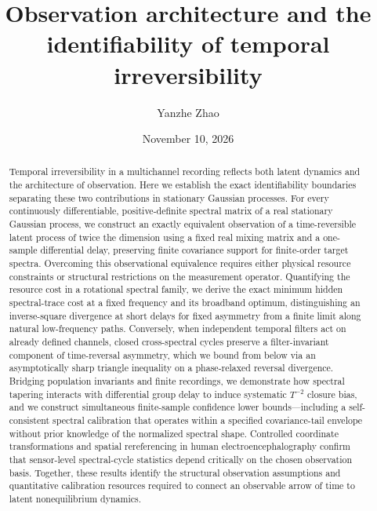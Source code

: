 \documentclass[aps,pre,reprint,amsmath,amssymb,superscriptaddress]{revtex4-2}
\begin{document}
\title{Observation architecture and the identifiability of temporal irreversibility}
\author{Yanzhe Zhao}
\date{November 10, 2026}
\begin{abstract}
Temporal irreversibility in a multichannel recording reflects both latent dynamics and the architecture of observation. Here we establish the exact identifiability boundaries separating these two contributions in stationary Gaussian processes. For every continuously differentiable, positive-definite spectral matrix of a real stationary Gaussian process, we construct an exactly equivalent observation of a time-reversible latent process of twice the dimension using a fixed real mixing matrix and a one-sample differential delay, preserving finite covariance support for finite-order target spectra. Overcoming this observational equivalence requires either physical resource constraints or structural restrictions on the measurement operator. Quantifying the resource cost in a rotational spectral family, we derive the exact minimum hidden spectral-trace cost at a fixed frequency and its broadband optimum, distinguishing an inverse-square divergence at short delays for fixed asymmetry from a finite limit along natural low-frequency paths. Conversely, when independent temporal filters act on already defined channels, closed cross-spectral cycles preserve a filter-invariant component of time-reversal asymmetry, which we bound from below via an asymptotically sharp triangle inequality on a phase-relaxed reversal divergence. Bridging population invariants and finite recordings, we demonstrate how spectral tapering interacts with differential group delay to induce systematic $T^{-2}$ closure bias, and we construct simultaneous finite-sample confidence lower bounds---including a self-consistent spectral calibration that operates within a specified covariance-tail envelope without prior knowledge of the normalized spectral shape. Controlled coordinate transformations and spatial rereferencing in human electroencephalography confirm that sensor-level spectral-cycle statistics depend critically on the chosen observation basis. Together, these results identify the structural observation assumptions and quantitative calibration resources required to connect an observable arrow of time to latent nonequilibrium dynamics.

\end{abstract}
\maketitle
\end{document}
